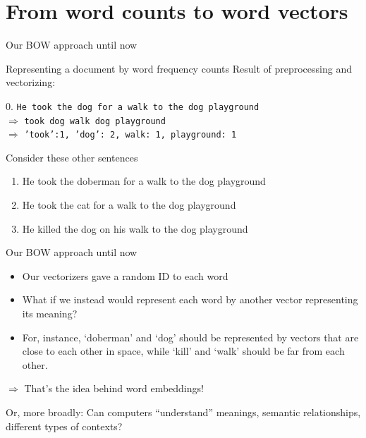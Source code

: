 \section[Word vectors]{From word counts to word vectors}


\begin{frame}{Our BOW approach until now}
  \begin{block}{Representing a document by word frequency counts}
    Result of preprocessing and vectorizing:
    
    0. \texttt{He took the dog for a walk to the dog playground}\\
    $\Rightarrow$ \texttt{took dog walk dog playground}\\
    $\Rightarrow$ \texttt{'took':1, 'dog': 2, walk: 1, playground: 1}
  \end{block}
  
  Consider these other sentences
  \begin{enumerate}
  \item<2-> He took the doberman for a walk to the dog playground
  \item<3-> He took the cat for a walk to the dog playground
  \item<4-> He killed the dog on his walk to the dog playground 
  \end{enumerate}
  
	
\end{frame}


\begin{frame}{Our BOW approach until now}
  \begin{itemize}
  \item Our vectorizers gave a random ID to each word
  \item What if we instead would represent each word by another vector representing its meaning?
  \item For, instance, `doberman' and `dog' should be represented by vectors that are close to each other in space, while `kill' and `walk' should be far from each other.
  \end{itemize}
  \pause
  $\Rightarrow$ That's the idea behind word embeddings!
  
  \pause
  
  Or, more broadly: Can computers ``understand'' meanings, semantic relationships, different types of contexts?
\end{frame}


